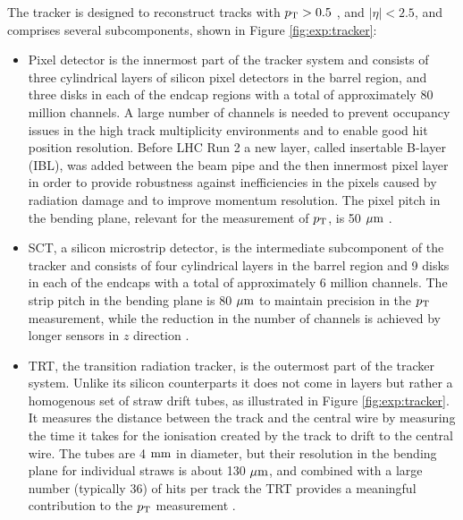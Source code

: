 The tracker is designed to reconstruct tracks with $p_{\text{T}} > 0.5$ \GeV, and
$|\eta| < 2.5$, and comprises several subcomponents, shown in Figure
\ref{fig:exp:tracker}:
\begin{itemize}
\item Pixel detector is the innermost part of the tracker system and
consists of three cylindrical layers of silicon pixel detectors in the
barrel region, and three disks in each of the endcap regions with a total of
approximately 80 million channels. A large number of channels is needed
to prevent occupancy issues in the high track multiplicity environments
and to enable good hit position resolution. Before LHC Run 2 a new layer,
called insertable B-layer (IBL), was added between the beam pipe and the
then innermost pixel layer in order to provide robustness against
inefficiencies in the pixels caused by radiation damage and to improve
momentum resolution. The pixel pitch in the bending plane, relevant for the
measurement of $p_{\text{T}}$, is 50 $\mu\text{m}$ \cite{CERN-LHCC-97-016, Aad:2008zzm, Capeans:1291633}. 
\item SCT, a silicon microstrip detector, is the intermediate subcomponent
of the tracker and consists of four cylindrical layers in the barrel region
and 9 disks in each of the endcaps with a total of approximately 6 million
channels. The strip pitch in the bending plane is 80 $\mu\text{m}$ to maintain
precision in the $p_{\text{T}}$ measurement, while the reduction in the number of
channels is achieved by longer sensors in $z$ direction \cite{CERN-LHCC-97-016, Aad:2008zzm}.
\item TRT, the transition radiation tracker, is the outermost part of the
tracker system. Unlike its silicon counterparts it does not come in layers
but rather a homogenous set of straw drift tubes, as illustrated in
Figure \ref{fig:exp:tracker}. It measures the distance between the track
and the central wire by measuring the time it takes for the ionisation
created by the track to drift to the central wire. The tubes are 4 $\text{mm}$
in diameter, but their resolution in the bending plane for individual
straws is about 130 $\mu\text{m}$, and combined with a large number (typically 36)
of hits per track the TRT provides a meaningful contribution to the
$p_{\text{T}}$ measurement \cite{CERN-LHCC-97-016, Aad:2008zzm}.
\end{itemize}

